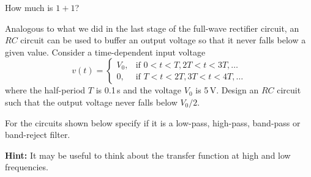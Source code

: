 \documentclass[letterpaper,addpoints]{exam}
\begin{document}
\begin{questions}
\begin{question}[1]
How much is $1 + 1$?
\vspace{1in}
\end{question}

\begin{question}[20]
Analogous to what we did in the last stage of the full-wave rectifier circuit, an $RC$ circuit can be used to buffer an output voltage so that it never falls below a given value.  Consider a time-dependent input voltage
\begin{equation}
 v(t) =
  \begin{cases}
   V_0, & \mbox{if } 0 < t < T, 2T < t < 3T,\ldots \\
   0,   & \mbox{if } T < t < 2T, 3T < t < 4T,\ldots
  \end{cases}
\end{equation}
where the half-period $T$ is 0.1\,s and the voltage $V_0$ is 5\,V.  Design an $RC$ circuit such that the output voltage never falls below $V_0 / 2$.
\end{question}

\pagebreak

\begin{question}
For the circuits shown below specify if it is a low-pass, high-pass, band-pass or band-reject filter.

{\bf Hint:} It may be useful to think about the transfer function at high and low frequencies.
\end{question}
\end{questions}
\end{document}
